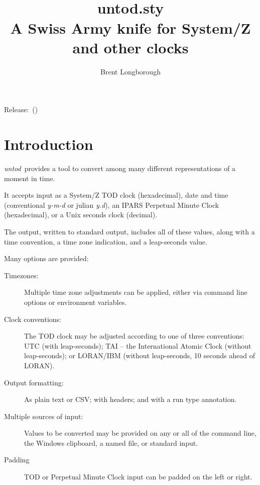 \documentclass[a4paper,10pt,twoside,openany]{memoir}
\newcommand{\sfit}[1]{\textit{#1}}
\newcommand{\tpname}{\sfit{untod}}
\newcommand{\tpfname}{\textsf{untod.sty}}
\begin{document}
\frontmatter
\title{%
	~\\[2\baselineskip]
	\Huge \tpfname\\[2ex]%
	\Large A Swiss Army knife for System/Z and other clocks
	}
\author{Brent Longborough}
\date{ }
\maketitle

{\centering
Release:\gitReln\ (\gitAbbrevHash)\\
}
\thispagestyle{empty}
\clearforchapter
\tableofcontents*
\mainmatter
\pagestyle{giruled}
\chapter{Introduction}
\tpname\ provides a tool to convert among 
many different representations of a moment in time.

It accepts input as a System/Z TOD clock (hexadecimal),
date and time 
(conventional \textit{y-m-d} or julian \textit{y.d}),
an IPARS Perpetual Minute Clock (hexadecimal),
or a Unix seconds clock (decimal).

The output, written to standard output,
includes all of these values, 
along with a time convention, a time zone indication,
and a leap-seconds value.

Many options are provided:

\begin{description}
    \item[Timezones:] 
    Multiple time zone adjustments can be applied,
    either via command line options or 
    environment variables.
    \item[Clock conventions:] 
    The TOD clock may be adjusted according to 
    one of three conventions: UTC (with leap-seconds);
    TAI -- the International Atomic Clock 
    (without leap-seconds); or
    LORAN/IBM (without leap-seconds, 
    10 seconds ahead of LORAN).
    \item[Output formatting:] 
    As plain text or CSV;
    with headers; and with a run type annotation. 
    \item[Multiple sources of input:] 
    Values to be converted may be provided 
    on any or all of the command line, 
    the Windows clipboard, a named file, 
    or standard input.
    \item[Padding] TOD or Perpetual Minute Clock input 
    can be padded on the left or right.     
\end{description}
\clearpage
\end{document}
